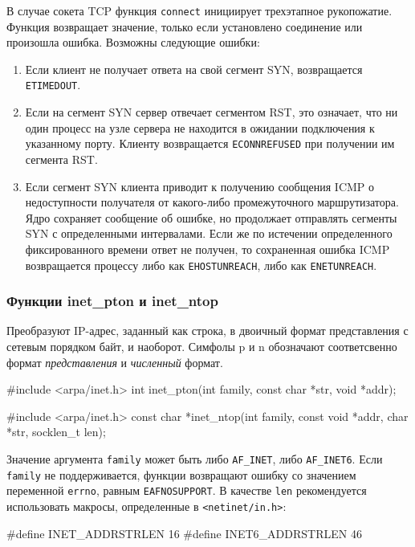 В случае сокета TCP функция \lstinline{connect} инициирует трехэтапное рукопожатие. Функция возвращает значение, только если установлено соединение или произошла ошибка. Возможны следующие ошибки:
\begin{enumerate}
  \item Если клиент не получает ответа на свой сегмент SYN, возвращается \lstinline{ETIMEDOUT}.
  \item Если на сегмент SYN сервер отвечает сегментом RST, это означает, что ни один процесс на узле сервера не находится в ожидании подключения к указанному порту. Клиенту возвращается \lstinline{ECONNREFUSED} при получении им сегмента RST.
  \item Если сегмент SYN клиента приводит к получению сообщения ICMP о недоступности получателя от какого-либо промежуточного маршрутизатора. Ядро сохраняет сообщение об ошибке, но продолжает отправлять сегменты SYN с определенными интервалами. Если же по истечении определенного фиксированного времени ответ не получен, то сохраненная ошибка ICMP возвращается процессу либо как \lstinline{EHOSTUNREACH}, либо как \lstinline{ENETUNREACH}.
\end{enumerate}

\subsubsection{Функции inet\_pton и inet\_ntop}
Преобразуют IP-адрес, заданный как строка, в двоичный формат представления с сетевым порядком байт, и наоборот. Симфолы p и n обозначают соответсвенно формат \emph{представления} и \emph{численный} формат.
\begin{clst}{}{}
#include <arpa/inet.h>
int inet_pton(int family, const char *str, void *addr);

#include <arpa/inet.h>
const char *inet_ntop(int family, const void *addr, char *str,
                      socklen_t len);
\end{clst}

Значение аргумента \lstinline{family} может быть либо \lstinline{AF_INET}, либо \lstinline{AF_INET6}. Если \lstinline{family} не поддерживается, функции возвращают ошибку со значением переменной \lstinline{errno}, равным \lstinline{EAFNOSUPPORT}. В качестве \lstinline{len} рекомендуется использовать макросы, определенные в \lstinline{<netinet/in.h>}:
\begin{clst}{}{}
#define  INET_ADDRSTRLEN    16
#define  INET6_ADDRSTRLEN   46
\end{clst}

